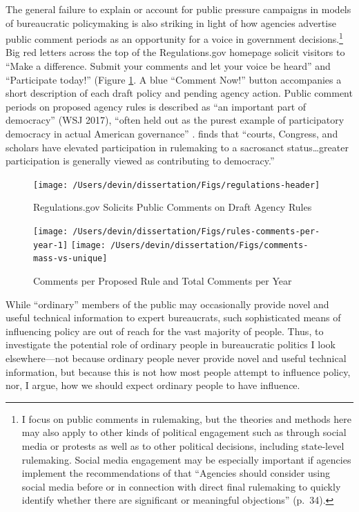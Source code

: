 \documentclass[
      12pt,
        ]{article}
\begin{document}
The general failure to explain or account for public pressure campaigns in models of bureaucratic policymaking is also striking in light of how agencies advertise public
comment periods as an opportunity for a voice in government
decisions.\footnote{I focus on public comments in rulemaking, but the theories and
  methods here may also apply to other kinds of political engagement
  such as through social media or protests as well as to other
  political decisions, including state-level rulemaking. Social media
  engagement may be especially important if agencies implement the
  recommendations of \citet{ACUS2018} that ``Agencies should consider using
  social media before or in connection with direct final rulemaking to
  quickly identify whether there are significant or meaningful
  objections'' (p.~34).} Big red letters across the top of the Regulations.gov
homepage solicit visitors to ``Make a difference. Submit your comments
and let your voice be heard'' and ``Participate today!'' (Figure \ref{fig:regsgov}. A blue ``Comment Now!'' button accompanies a short description of each draft
policy and pending agency action.
Public comment periods on proposed agency
rules is described as ``an important part of democracy'' (WSJ 2017),
``often held out as the purest example of participatory democracy in
actual American governance'' \citep{Herz2016}. \citet{Rossi1997} finds that ``courts, Congress, and scholars have elevated participation in rulemaking to
a sacrosanct status\ldots greater participation is generally viewed as
contributing to democracy.''

\begin{figure}

{\centering \texttt{[image: /Users/devin/dissertation/Figs/regulations-header]} 

}

\caption{Regulations.gov Solicits Public Comments on Draft Agency Rules}\label{fig:regsgov}
\end{figure}

\begin{figure}

{\centering \texttt{[image: /Users/devin/dissertation/Figs/rules-comments-per-year-1]} \texttt{[image: /Users/devin/dissertation/Figs/comments-mass-vs-unique]} 

}

\caption{Comments per Proposed Rule and Total Comments per Year}\label{fig:comments-per-year}
\end{figure}

While ``ordinary'' members of the public may occasionally provide novel
and useful technical information to expert bureaucrats, such
sophisticated means of influencing policy are out of reach for the vast
majority of people. Thus, to investigate the potential role of ordinary
people in bureaucratic politics I look elsewhere---not because ordinary
people never provide novel and useful technical information, but because
this is not how most people attempt to influence policy, nor, I argue,
how we should expect ordinary people to have influence.
\end{document}
